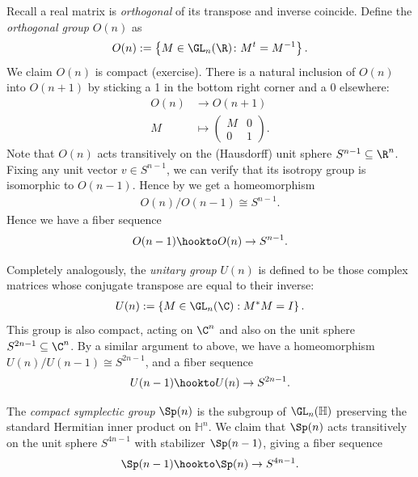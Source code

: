 \documentclass[11pt]{amsart}
\begin{document}
\begin{example}
Recall a real matrix is \emph{orthogonal} of its transpose and inverse coincide. Define the \emph{orthogonal group} $O(n)$ as
\begin{align*}
    O(n) := \left\{ M \in \GL_n(\R) \colon M^t = M^{-1} \right\}.
\end{align*}
We claim $O(n)$ is compact (exercise). There is a natural inclusion of $O(n)$ into $O(n+1)$ by sticking a 1 in the bottom right corner and a 0 elsewhere:
\begin{align*}
    O(n) &\to O(n+1) \\
    M &\mapsto \begin{pmatrix} M & 0 \\ 0 & 1 \end{pmatrix}.
\end{align*}
Note that $O(n)$ acts transitively on the (Hausdorff) unit sphere $S^{n-1} \subseteq \R^n$. Fixing any unit vector $v\in S^{n-1}$, we can verify that its isotropy group is isomorphic to $O(n-1)$. Hence by  we get a homeomorphism
\begin{align*}
    O(n)/O(n-1) \cong S^{n-1}.
\end{align*}
Hence we have a fiber sequence
\begin{align*}
    O(n-1) \hookto O(n) \to S^{n-1}.
\end{align*}
\end{example}

\begin{example} Completely analogously, the \emph{unitary group} $U(n)$ is defined to be those complex matrices whose conjugate transpose are equal to their inverse:
\begin{align*}
    U(n) := \left\{ M\in \GL_n(\C) : M^\ast M = I \right\}.
\end{align*}
This group is also compact, acting on $\C^n$ and also on the unit sphere $S^{2n-1} \subseteq \C^n$. By a similar argument to above, we have a homeomorphism $U(n)/U(n-1) \cong S^{2n-1}$, and a fiber sequence
\begin{align*}
    U(n-1) \hookto U(n) \to S^{2n-1}.
\end{align*}
\end{example}

\begin{example} The \emph{compact symplectic group} $\Sp(n)$ is the subgroup of $\GL_n(\mathbb{H})$ preserving the standard Hermitian inner product on $\mathbb{H}^n$. We claim that $\Sp(n)$ acts transitively on the unit sphere $S^{4n-1}$ with stabilizer $\Sp(n-1)$, giving a fiber sequence
\begin{align*}
    \Sp(n-1) \hookto \Sp(n) \to S^{4n-1}.
\end{align*}
\end{example}
\end{document}
